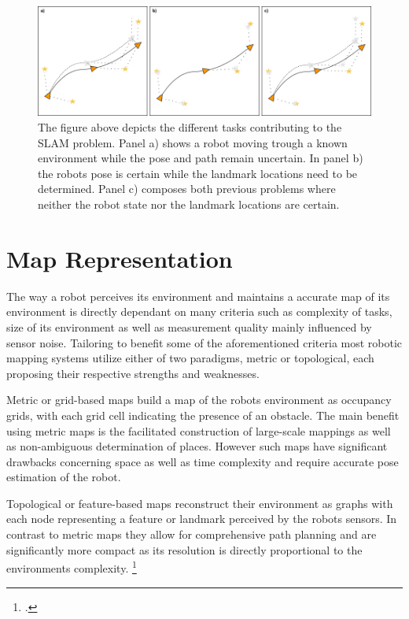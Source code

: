 \begin{figure}
	\centering
	\includegraphics[width=1.0\linewidth]{img/slamOverview}
	\caption{
		The figure above depicts the different tasks contributing to the SLAM problem. Panel a) shows a robot moving trough a known environment while the pose and path remain uncertain. In panel b) the robots pose is certain while the landmark locations need to be determined. Panel c) composes both previous problems where neither the robot state nor the landmark locations are certain.
	}
	\label{fig:slamOverview}
\end{figure}

\section{Map Representation}
The way a robot perceives its environment and maintains a accurate map of its environment is directly dependant on many criteria such as complexity of tasks, size of its environment as well as measurement quality mainly influenced by sensor noise. 
Tailoring to benefit some of the aforementioned criteria most robotic mapping systems utilize either of two paradigms, metric or topological, each proposing their respective strengths and weaknesses.

Metric or grid-based maps build a map of the robots environment as occupancy grids, with each grid cell indicating the presence of an obstacle. The main benefit using metric maps is the facilitated construction of large-scale mappings as well as non-ambiguous determination of places. However such maps have significant drawbacks concerning space as well as time complexity and require accurate pose estimation of the robot.

Topological or feature-based maps reconstruct their environment as graphs with each node representing a feature or landmark perceived by the robots sensors. In contrast to metric maps they allow for comprehensive path planning and are significantly more compact as its resolution is directly proportional to the environments complexity. \footcite{thrunMaps1998}


